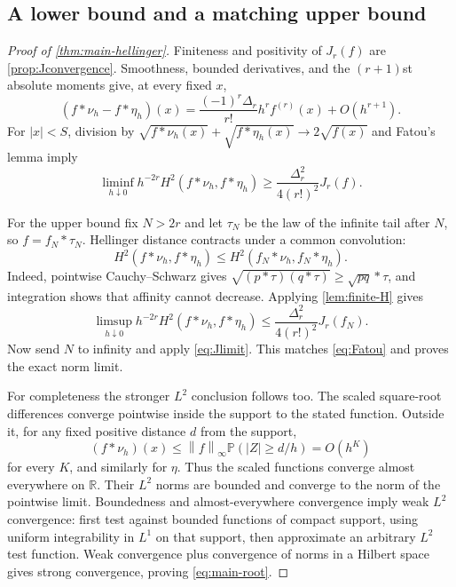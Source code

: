 \documentclass[11pt,a4paper]{article}
\numberwithin{equation}{section}
\theoremstyle{definition}
\theoremstyle{remark}
\newcommand{\R}{\mathbb R}
\newcommand{\Prob}{\mathbb P}
\newcommand{\norm}[1]{\left\lVert#1\right\rVert}
\begin{document}
\subsection{A lower bound and a matching upper bound}
\begin{proof}[Proof of \cref{thm:main-hellinger}]
Finiteness and positivity of $J_r(f)$ are \cref{prop:Jconvergence}. Smoothness,
bounded derivatives, and the $(r+1)$st absolute moments give, at every fixed
$x$,
\[
 (f*\nu_h-f*\eta_h)(x)
 =\frac{(-1)^r\Delta_r}{r!}h^rf^{(r)}(x)+O(h^{r+1}).
\]
For $|x|<S$, division by
$\sqrt{f*\nu_h(x)}+\sqrt{f*\eta_h(x)}\to2\sqrt{f(x)}$
and Fatou's lemma imply
\begin{equation}
 \liminf_{h\downarrow0}h^{-2r}H^2(f*\nu_h,f*\eta_h)
 \ge\frac{\Delta_r^2}{4(r!)^2}J_r(f).
 \label{eq:Fatou}
\end{equation}

For the upper bound fix $N>2r$ and let $\tau_N$ be the law of the infinite
tail after $N$, so $f=f_N*\tau_N$. Hellinger distance contracts under a
common convolution:
\begin{equation}
 H^2(f*\nu_h,f*\eta_h)\le H^2(f_N*\nu_h,f_N*\eta_h).
 \label{eq:Hcontract}
\end{equation}
Indeed, pointwise Cauchy--Schwarz gives
$\sqrt{(p*\tau)(q*\tau)}\ge\sqrt{pq}*\tau$, and integration shows that
affinity cannot decrease. Applying \cref{lem:finite-H} gives
\[
 \limsup_{h\downarrow0}h^{-2r}H^2(f*\nu_h,f*\eta_h)
 \le\frac{\Delta_r^2}{4(r!)^2}J_r(f_N).
\]
Now send $N$ to infinity and apply \eqref{eq:Jlimit}. This matches
\eqref{eq:Fatou} and proves the exact norm limit.

For completeness the stronger $L^2$ conclusion follows too. The scaled
square-root differences converge pointwise inside the support to the stated
function. Outside it, for any fixed positive distance $d$ from the support,
\[
 (f*\nu_h)(x)\le\norm f_\infty\Prob(|Z|\ge d/h)=O(h^K)
\]
for every $K$, and similarly for $\eta$. Thus the scaled functions converge
almost everywhere on $\R$. Their $L^2$ norms are bounded and converge to
the norm of the pointwise limit. Boundedness and almost-everywhere convergence
imply weak $L^2$ convergence: first test against bounded functions of compact
support, using uniform integrability in $L^1$ on that support, then approximate
an arbitrary $L^2$ test function. Weak convergence plus convergence of norms
in a Hilbert space gives strong convergence, proving \eqref{eq:main-root}.
\end{proof}
\end{document}
